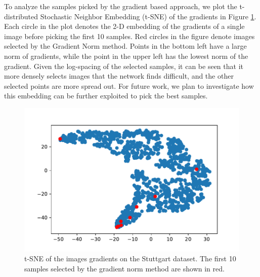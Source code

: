 \documentclass[letterpaper, 10 pt, conference]{ieeeconf}  %
\begin{document}
   
  To analyze the samples picked by the gradient based approach, we plot the t-distributed Stochastic Neighbor Embedding (t-SNE) of the gradients in Figure \ref{fig:tsne}. Each circle in the plot denotes the 2-D embedding of the gradients of a single image before picking the first 10 samples. Red circles in the figure denote images selected by the Gradient Norm method. Points in the bottom left have a large norm of gradients, while the point in the upper left has the lowest norm of the gradient. Given the log-spacing of the selected samples, it can be seen that it more densely selects images that the network finds difficult, and the other selected points are more spread out. For future work, we plan to investigate how this embedding can be further exploited to pick the best samples.
   
       \begin{figure}
    \centering
    \includegraphics[width=\linewidth]{pics/tsne_grad_norm.pdf}
   		\caption{t-SNE of the images gradients on the Stuttgart dataset. The first 10 samples selected by the gradient norm method are shown in red.}
		\label{fig:tsne}    		
   \end{figure}
\end{document}
